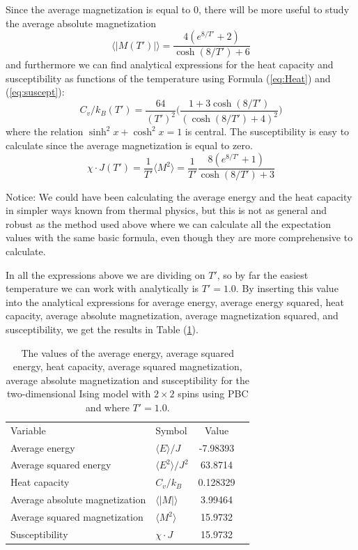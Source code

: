 \documentclass[norsk,a4paper,12pt]{article}
\begin{document}
Since the average magnetization is equal to 0, there will be more useful to study the average absolute magnetization
\begin{equation}
\langle|M(T')|\rangle=\frac{4(e^{8/T'}+2)}{\cosh(8/T')+6}
\end{equation}
and furthermore we can find analytical expressions for the heat capacity and susceptibility as functions of the temperature using Formula (\ref{eq:Heat}) and (\ref{eq:suscept}):
\begin{equation}
C_v/k_B(T')=\frac{64}{(T')^2}\bigg(\frac{1+3\cosh(8/T')}{(\cosh(8/T')+4)^2}\bigg)
\end{equation}
where the relation $\sinh^2x+\cosh^2x=1$ is central. The susceptibility is easy to calculate since the average magnetization is equal to zero.
\begin{equation}
\chi\cdot J(T')=\frac{1}{T'}\langle M^2\rangle=\frac{1}{T'}\frac{8(e^{8/T'}+1)}{\cosh(8/T')+3}
\end{equation}

Notice: We could have been calculating the average energy and the heat capacity in simpler ways known from thermal physics, but this is not as general and robust as the method used above where we can calculate all the expectation values with the same basic formula, even though they are more comprehensive to calculate. \par\vspace{5mm}

In all the expressions above we are dividing on $T'$, so by far the easiest temperature we can work with analytically is $T'=1.0$. By inserting this value into the analytical expressions for average energy, average energy squared, heat capacity, average absolute magnetization, average magnetization squared, and susceptibility, we get the results in Table (\ref{tab:analyticalvalues}).
\begin{table}[H]
\centering
\caption{The values of the average energy, average squared energy, heat capacity, average squared magnetization, average absolute magnetization and susceptibility for the two-dimensional Ising model with $2\times2$ spins using PBC and where $T'=1.0$.}
\label{tab:analyticalvalues} 
\begin{tabularx}{\textwidth}{lXcr}
&&\\
\toprule
Variable & Symbol & Value\\
\midrule
Average energy & $\langle E\rangle/J$ & -7.98393\\ 
Average squared energy & $\langle E^2\rangle/J^2$ & 63.8714\\ 
Heat capacity & $C_v/k_B$  & 0.128329\\
\midrule
Average absolute magnetization & $\langle |M|\rangle$ & 3.99464\\
Average squared magnetization & $\langle M^2\rangle$ & 15.9732\\
Susceptibility & $\chi\cdot J$ & 15.9732\\
\bottomrule
\end{tabularx}
\end{table}
\end{document}

